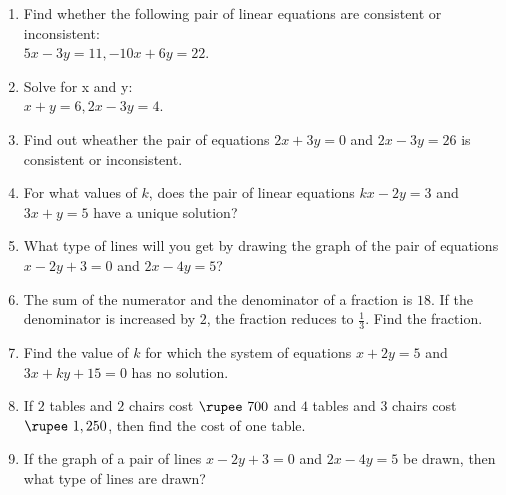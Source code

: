 \documentclass{article}
\begin{document}
\begin{enumerate}
    \item Find whether the following pair of linear equations are consistent or inconsistent:\\
    \hspace*{2cm} $5x - 3y = 11, -10x + 6y = 22$.
    
    \item Solve for x and y:\\
    \hspace*{2cm} $x + y = 6, 2x - 3y = 4$.\\
    \item Find out wheather the pair of equations $2x + 3y = 0$ and $2x - 3y = 26$ is consistent or inconsistent.
    
    \item For what values of $k$, does the pair of linear equations $kx - 2y = 3$ and $3x + y = 5$ have a unique solution?
    
    \item What type of lines will you get by drawing the graph of the pair of equations $x - 2y + 3 = 0$ and $2x - 4y = 5$?
    
    \item The sum of the numerator and the denominator of a fraction is $18$. If the denominator is increased by $2$, the fraction reduces to $\frac{1}{3}$. Find the fraction.
    
    \item Find the value of $k$ for which the system of equations $x + 2y = 5$ and $3x + ky + 15 = 0$ has no solution.
    
    \item If $2$ tables and $2$ chairs cost $\rupee~700$ and $4$ tables and $3$ chairs cost $\rupee~1,250$, then find the cost of one table.
    
    \item If the graph of a pair of lines $x - 2y + 3 = 0$ and $2x - 4y = 5$ be drawn, then what type of lines are drawn?
    

\end{enumerate}
\end{document}
